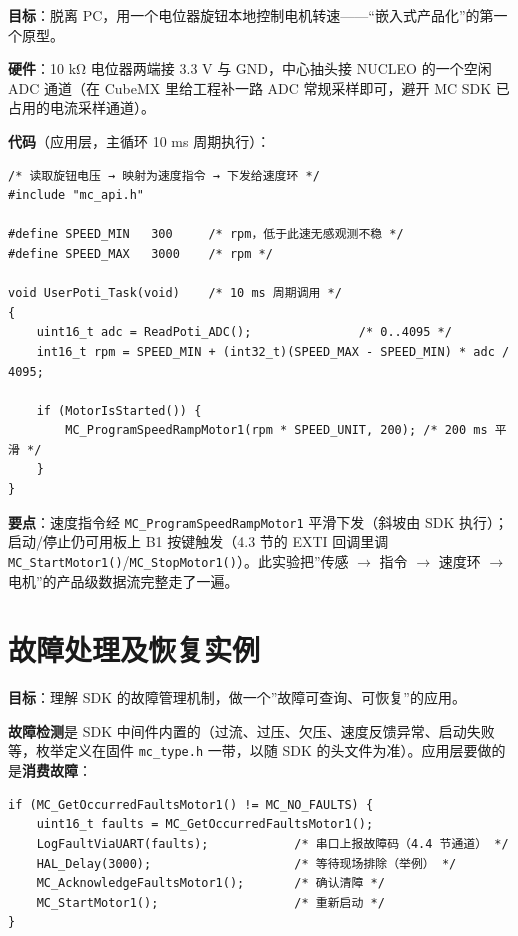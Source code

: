 \documentclass[
  UTF8,
  scheme=plain,
  fontsize=10pt,
  openany
]{ctexbook}
\begin{document}
\textbf{目标}：脱离
PC，用一个电位器旋钮本地控制电机转速------``嵌入式产品化''的第一个原型。

\textbf{硬件}：10 kΩ 电位器两端接 3.3 V 与 GND，中心抽头接 NUCLEO
的一个空闲 ADC 通道（在 CubeMX 里给工程补一路 ADC 常规采样即可，避开 MC
SDK 已占用的电流采样通道）。

\textbf{代码}（应用层，主循环 10 ms 周期执行）：

\begin{verbatim}
/* 读取旋钮电压 → 映射为速度指令 → 下发给速度环 */
#include "mc_api.h"

#define SPEED_MIN   300     /* rpm，低于此速无感观测不稳 */
#define SPEED_MAX   3000    /* rpm */

void UserPoti_Task(void)    /* 10 ms 周期调用 */
{
    uint16_t adc = ReadPoti_ADC();               /* 0..4095 */
    int16_t rpm = SPEED_MIN + (int32_t)(SPEED_MAX - SPEED_MIN) * adc / 4095;

    if (MotorIsStarted()) {
        MC_ProgramSpeedRampMotor1(rpm * SPEED_UNIT, 200); /* 200 ms 平滑 */
    }
}
\end{verbatim}

\textbf{要点}：速度指令经 \texttt{MC\_ProgramSpeedRampMotor1}
平滑下发（斜坡由 SDK 执行）；启动/停止仍可用板上 B1 按键触发（4.3 节的
EXTI 回调里调
\texttt{MC\_StartMotor1()}/\texttt{MC\_StopMotor1()}）。此实验把''传感
\(\rightarrow\) 指令 \(\rightarrow\) 速度环 \(\rightarrow\)
电机''的产品级数据流完整走了一遍。

\section{故障处理及恢复实例}\label{ux6545ux969cux5904ux7406ux53caux6062ux590dux5b9eux4f8b}

\textbf{目标}：理解 SDK
的故障管理机制，做一个''故障可查询、可恢复''的应用。

\textbf{故障检测}是 SDK
中间件内置的（过流、过压、欠压、速度反馈异常、启动失败等，枚举定义在固件
\texttt{mc\_type.h} 一带，以随 SDK
的头文件为准）。应用层要做的是\textbf{消费故障}：

\begin{verbatim}
if (MC_GetOccurredFaultsMotor1() != MC_NO_FAULTS) {
    uint16_t faults = MC_GetOccurredFaultsMotor1();
    LogFaultViaUART(faults);            /* 串口上报故障码（4.4 节通道） */
    HAL_Delay(3000);                    /* 等待现场排除（举例） */
    MC_AcknowledgeFaultsMotor1();       /* 确认清障 */
    MC_StartMotor1();                   /* 重新启动 */
}
\end{verbatim}
\end{document}
